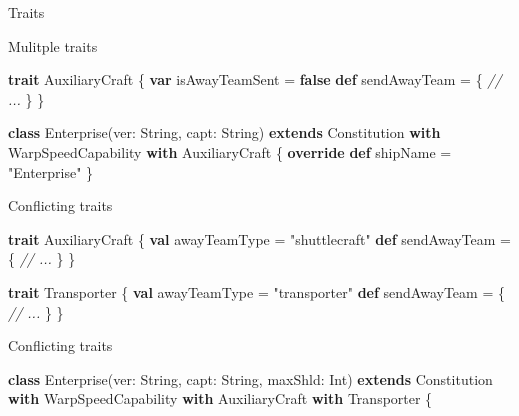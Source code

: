 \documentclass[ignorenonframetext,]{beamer}
\newenvironment{Shaded}{\begin{snugshade}}{\end{snugshade}}
\newcommand{\KeywordTok}[1]{\textcolor[rgb]{0.13,0.29,0.53}{\textbf{#1}}}
\newcommand{\StringTok}[1]{\textcolor[rgb]{0.31,0.60,0.02}{#1}}
\newcommand{\CommentTok}[1]{\textcolor[rgb]{0.56,0.35,0.01}{\textit{#1}}}
\newcommand{\FunctionTok}[1]{\textcolor[rgb]{0.00,0.00,0.00}{#1}}
\newcommand{\NormalTok}[1]{#1}
\begin{document}
\begin{frame}[fragile]{Traits}
\begin{block}{Mulitple traits}

\begin{Shaded}
\begin{Highlighting}[]
\KeywordTok{trait}\NormalTok{ AuxiliaryCraft \{}
    \KeywordTok{var}\NormalTok{ isAwayTeamSent = }\KeywordTok{false}
    \KeywordTok{def}\NormalTok{ sendAwayTeam = \{}
        \CommentTok{// ...}
\NormalTok{    \}}
\NormalTok{\}}

\KeywordTok{class} \FunctionTok{Enterprise}\NormalTok{(ver: String, capt: String) }
\KeywordTok{extends}\NormalTok{ Constitution }\KeywordTok{with}\NormalTok{ WarpSpeedCapability }\KeywordTok{with}\NormalTok{ AuxiliaryCraft \{}
    \KeywordTok{override} \KeywordTok{def}\NormalTok{ shipName = }\StringTok{"Enterprise"}
\NormalTok{\}}
\end{Highlighting}
\end{Shaded}

\end{block}

\begin{block}{Conflicting traits}

\begin{Shaded}
\begin{Highlighting}[]
\KeywordTok{trait}\NormalTok{ AuxiliaryCraft \{}
    \KeywordTok{val}\NormalTok{ awayTeamType = }\StringTok{"shuttlecraft"}
    \KeywordTok{def}\NormalTok{ sendAwayTeam = \{}
        \CommentTok{// ...}
\NormalTok{    \}}
\NormalTok{\}}

\KeywordTok{trait}\NormalTok{ Transporter \{}
    \KeywordTok{val}\NormalTok{ awayTeamType = }\StringTok{"transporter"}
    \KeywordTok{def}\NormalTok{ sendAwayTeam = \{}
        \CommentTok{// ...}
\NormalTok{    \}}
\NormalTok{\}}
\end{Highlighting}
\end{Shaded}

\end{block}

\begin{block}{Conflicting traits}

\begin{Shaded}
\begin{Highlighting}[]
\KeywordTok{class} \FunctionTok{Enterprise}\NormalTok{(ver: String, capt: String, maxShld: Int) }
\KeywordTok{extends}\NormalTok{ Constitution }\KeywordTok{with}\NormalTok{ WarpSpeedCapability }
                     \KeywordTok{with}\NormalTok{ AuxiliaryCraft }
                     \KeywordTok{with}\NormalTok{ Transporter \{}
                     

\end{Highlighting}
\end{Shaded}
\end{block}
\end{frame}
\end{document}
